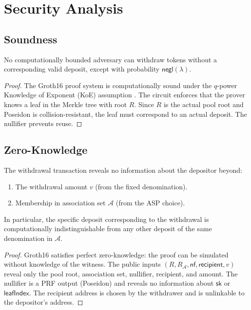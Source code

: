 \section{Security Analysis}
\label{sec:security}

\subsection{Soundness}

\begin{theorem}[Soundness]
No computationally bounded adversary can withdraw tokens without a corresponding valid deposit, except with probability $\mathsf{negl}(\lambda)$.
\end{theorem}

\begin{proof}
The Groth16 proof system is computationally sound under the $q$-power Knowledge of Exponent (KoE) assumption \cite{groth2016size}. The circuit enforces that the prover knows a leaf in the Merkle tree with root $R$. Since $R$ is the actual pool root and Poseidon is collision-resistant, the leaf must correspond to an actual deposit. The nullifier prevents reuse.
\end{proof}

\subsection{Zero-Knowledge}

\begin{theorem}[Privacy]
The withdrawal transaction reveals no information about the depositor beyond:
\begin{enumerate}
    \item The withdrawal amount $v$ (from the fixed denomination).
    \item Membership in association set $\mathcal{A}$ (from the ASP choice).
\end{enumerate}
In particular, the specific deposit corresponding to the withdrawal is computationally indistinguishable from any other deposit of the same denomination in $\mathcal{A}$.
\end{theorem}

\begin{proof}
Groth16 satisfies perfect zero-knowledge: the proof can be simulated without knowledge of the witness. The public inputs $(R, R_{\mathcal{A}}, \mathsf{nf}, \mathsf{recipient}, v)$ reveal only the pool root, association set, nullifier, recipient, and amount. The nullifier is a PRF output (Poseidon) and reveals no information about $\mathsf{sk}$ or $\mathsf{leafIndex}$. The recipient address is chosen by the withdrawer and is unlinkable to the depositor's address.
\end{proof}

